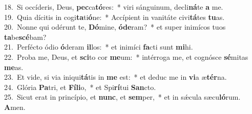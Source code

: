 {18.~}Si occíderis, Deus, \textbf{pec}ca\textbf{tó}res:~* viri sánguinum, decli\textbf{ná}te \textbf{a} me.\\
{19.~}Quia dícitis in cogi\textbf{ta}ti\textbf{ó}ne:~* Accípient in vanitáte civi\textbf{tá}tes \textbf{tu}as.\\
{20.~}Nonne qui odérunt te, \textbf{Dó}mine, \textbf{ó}\textbf{de}ram?~* et super inimícos tuos \textbf{ta}be\textbf{scé}bam?\\
{21.~}Perfécto ódio \textbf{ó}deram \textbf{il}los:~* et inimíci \textbf{fa}cti sunt \textbf{mi}hi.\\
{22.~}Proba me, Deus, et \textbf{sci}to cor \textbf{me}um:~* intérroga me, et cognósce \textbf{sé}mitas \textbf{me}as.\\
{23.~}Et vide, si via iniqui\textbf{tá}tis in \textbf{me} est:~* et deduc me in \textbf{vi}a æ\textbf{tér}na.\\
{24.~}Glória \textbf{Pa}tri, et \textbf{Fí}\textbf{li}o,~* et Spi\textbf{rí}tui \textbf{San}cto.\\
{25.~}Sicut erat in princípio, et \textbf{nunc}, et \textbf{sem}per,~* et in sǽcula sæcu\textbf{ló}rum. \textbf{A}men.\\
